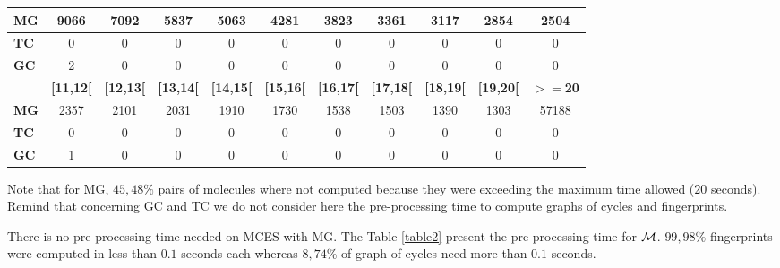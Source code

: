 \documentclass[10pt,letterpaper]{article}
\begin{document}
\begin{table}[!ht]
\begin{adjustwidth}{-0.75in}{0in}
\begin{tabular}{|p{1.5cm}|*{10}{@{\hskip.01mm}c@{\hskip.01mm}|}}
\hline

\textbf{MG}& 9066 & 7092 & 5837 & 5063 & 4281 & 3823 & 3361 & 3117 & 2854 & 2504 \\

\hline

\textbf{TC}& 0 & 0 & 0 & 0 & 0 & 0 & 0 & 0 & 0 & 0 \\

\hline

\textbf{GC}& 2 & 0 & 0 & 0 & 0 & 0 & 0 & 0 & 0 & 0 \\

\hline

\Xhline{2pt}

& \textbf{[11,12[}& \textbf{[12,13[} & \textbf{[13,14[ }&\textbf{[14,15[}& \textbf{[15,16[} & \textbf{[16,17[} & \textbf{[17,18[} &\textbf{[18,19[}&\textbf{[19,20[}&\textbf{ $>=$20} \\

\hline

\textbf{MG}& 2357 & 2101 & 2031 & 1910 & 1730 & 1538 & 1503 & 1390 & 1303 & 57188 \\

\hline

\textbf{TC}& 0 & 0 & 0 & 0 & 0 & 0 & 0 & 0 & 0 & 0 \\

\hline

\textbf{GC}& 1 & 0 & 0 & 0 & 0 & 0 & 0 & 0 & 0 & 0 \\

\hline

\end{tabular}

\begin{flushleft}Note that for MG, $45,48\%$ pairs of molecules where not computed because they were exceeding the maximum time allowed ($20$ seconds). Remind that concerning GC and TC we do not consider here the pre-processing time to compute graphs of cycles and fingerprints.

\end{flushleft}

\label{table1}

\end{adjustwidth}

\end{table}

There is no pre-processing time needed on MCES with MG. The Table \ref{table2} present the pre-processing time for ${\cal M}$. $99,98\%$ fingerprints were computed in less than $0.1$ seconds each whereas $8,74\%$ of graph of cycles need more than $0.1$ seconds.
\end{document}
